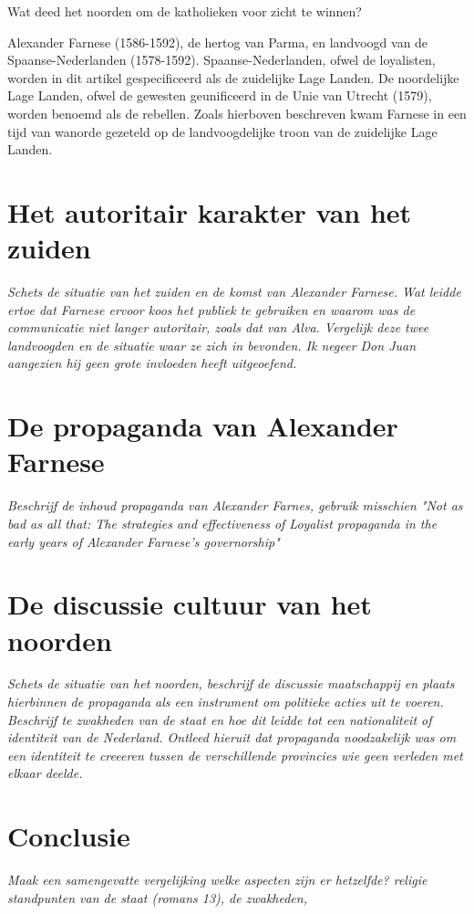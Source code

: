 \documentclass[11pt]{amsart}
\begin{document}
Wat deed het noorden om de katholieken voor zicht te winnen?
\autocite[89]{stenslandHabsburgCommunicationDutch2012}\autocite{vandersteenRememberingRevoltLow2018}

Alexander Farnese (1586-1592), de hertog van Parma, en landvoogd van de Spaanse-Nederlanden (1578-1592). Spaanse-Nederlanden, ofwel de loyalisten, worden in dit artikel gespecificeerd als de zuidelijke Lage Landen. De noordelijke Lage Landen, ofwel de gewesten geunificeerd in de Unie van Utrecht (1579), worden benoemd als de rebellen. Zoals hierboven beschreven kwam Farnese in een tijd van wanorde gezeteld op de landvoogdelijke troon van de zuidelijke Lage Landen. 

\autocite[150]{stenslandHabsburgCommunicationDutch2012}


\newpage

\section{Het autoritair karakter van het zuiden}
\textit{Schets de situatie van het zuiden en de komst van Alexander Farnese. Wat leidde ertoe dat Farnese ervoor koos het
     publiek te gebruiken en waarom was de communicatie niet langer autoritair, zoals dat van Alva. Vergelijk deze twee
     landvoogden en de situatie waar ze zich in bevonden. Ik negeer Don Juan aangezien hij geen grote invloeden heeft
     uitgeoefend.}

\section{De propaganda van Alexander Farnese}
\textit{Beschrijf de inhoud propaganda van Alexander Farnes, gebruik misschien "Not as bad as all that: The strategies and effectiveness of Loyalist propaganda in the early years of Alexander Farnese's governorship"}

\section{De discussie cultuur van het noorden}
\textit{Schets de situatie van het noorden, beschrijf de discussie maatschappij en plaats hierbinnen de propaganda als een
     instrument om politieke acties uit te voeren. Beschrijf te zwakheden van de staat en hoe dit leidde tot een nationaliteit of identiteit van de Nederland. Ontleed hieruit dat propaganda noodzakelijk was om een identiteit te creeeren tussen de verschillende provincies wie geen verleden met elkaar deelde. }

\section{Conclusie}
\textit{Maak een samengevatte vergelijking welke aspecten zijn er hetzelfde? religie standpunten van de staat (romans 13), de zwakheden, }

\newpage\printbibliography{}
\end{document}
